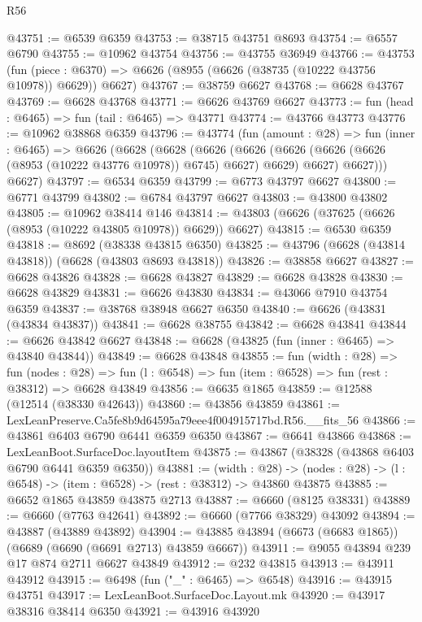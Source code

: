 \begin{lexlean}{R56}
\begin{coremodule}
@43751 := @6539 @6359
@43753 := @38715 @43751 @8693
@43754 := @6557 @6790
@43755 := @10962 @43754
@43756 := @43755 @36949
@43766 := @43753
    (fun (piece : @6370) => @6626 (@8955 (@6626 (@38735 (@10222 @43756 @10978)) @6629)) @6627)
@43767 := @38759 @6627
@43768 := @6628 @43767
@43769 := @6628 @43768
@43771 := @6626 @43769 @6627
@43773 := fun (head : @6465) => fun (tail : @6465) => @43771
@43774 := @43766 @43773
@43776 := @10962 @38868 @6359
@43796 := @43774
    (fun (amount : @28) =>
    fun (inner : @6465) =>
    @6626
      (@6628
        (@6628
          (@6626
            (@6626 (@6626 (@6626 (@6626 (@8953 (@10222 @43776 @10978)) @6745) @6627) @6629) @6627)
            @6627)))
      @6627)
@43797 := @6534 @6359
@43799 := @6773 @43797 @6627
@43800 := @6771 @43799
@43802 := @6784 @43797 @6627
@43803 := @43800 @43802
@43805 := @10962 @38414 @146
@43814 := @43803 (@6626 (@37625 (@6626 (@8953 (@10222 @43805 @10978)) @6629)) @6627)
@43815 := @6530 @6359
@43818 := @8692 (@38338 @43815 @6350)
@43825 := @43796 (@6628 (@43814 @43818)) (@6628 (@43803 @8693 @43818))
@43826 := @38858 @6627
@43827 := @6628 @43826
@43828 := @6628 @43827
@43829 := @6628 @43828
@43830 := @6628 @43829
@43831 := @6626 @43830
@43834 := @43066 @7910 @43754 @6359
@43837 := @38768 @38948 @6627 @6350
@43840 := @6626 (@43831 (@43834 @43837))
@43841 := @6628 @38755
@43842 := @6628 @43841
@43844 := @6626 @43842 @6627
@43848 := @6628 (@43825 (fun (inner : @6465) => @43840 @43844))
@43849 := @6628 @43848
@43855 := fun (width : @28) =>
  fun (nodes : @28) => fun (l : @6548) => fun (item : @6528) => fun (rest : @38312) => @6628 @43849
@43856 := @6635 @1865
@43859 := @12588 (@12514 (@38330 @42643))
@43860 := @43856 @43859
@43861 := LexLeanPreserve.Ca5fe8b9d64595a79eee4f004915717bd.R56.__fits_56
@43866 := @43861 @6403 @6790 @6441 @6359 @6350
@43867 := @6641 @43866
@43868 := LexLeanBoot.SurfaceDoc.layoutItem
@43875 := @43867 (@38328 (@43868 @6403 @6790 @6441 @6359 @6350))
@43881 := (width : @28) ->
  (nodes : @28) -> (l : @6548) -> (item : @6528) -> (rest : @38312) -> @43860 @43875
@43885 := @6652 @1865 @43859 @43875 @2713
@43887 := @6660 (@8125 @38331)
@43889 := @6660 (@7763 @42641)
@43892 := @6660 (@7766 @38329) @43092
@43894 := @43887 (@43889 @43892)
@43904 := @43885 @43894 (@6673 (@6683 @1865)) (@6689 (@6690 (@6691 @2713) @43859 @6667))
@43911 := @9055 @43894 @239 @17 @874 @2711 @6627 @43849
@43912 := @232 @43815
@43913 := @43911 @43912
@43915 := @6498 (fun ("_" : @6465) => @6548)
@43916 := @43915 @43751
@43917 := LexLeanBoot.SurfaceDoc.Layout.mk
@43920 := @43917 @38316 @38414 @6350
@43921 := @43916 @43920

\end{coremodule}
\end{lexlean}
